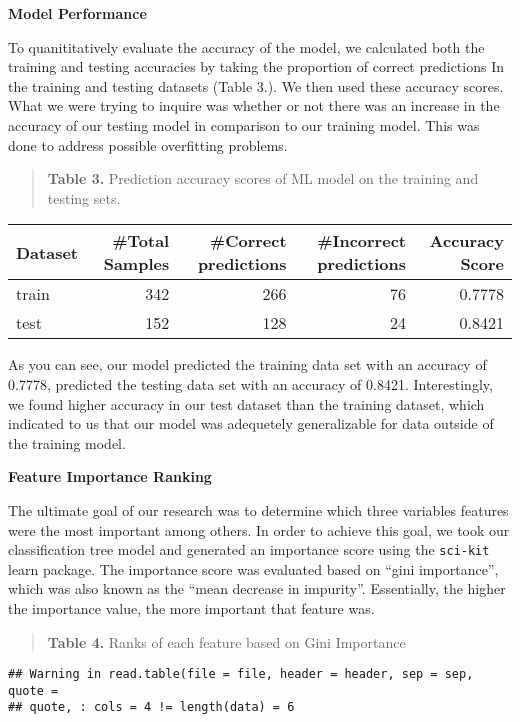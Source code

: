 \documentclass[]{article}
\begin{document}
\newpage

\textbf{Model Performance}

To quanititatively evaluate the accuracy of the model, we calculated
both the training and testing accuracies by taking the proportion of
correct predictions In the training and testing datasets (Table 3.). We
then used these accuracy scores. What we were trying to inquire was
whether or not there was an increase in the accuracy of our testing
model in comparison to our training model. This was done to address
possible overfitting problems.

\begin{quote}
\textbf{Table 3.} Prediction accuracy scores of ML model on the training
and testing sets.
\end{quote}

\begin{longtable}[]{@{}lrrrr@{}}
\toprule
Dataset & \#Total Samples & \#Correct predictions & \#Incorrect
predictions & Accuracy Score\tabularnewline
\midrule
\endhead
train & 342 & 266 & 76 & 0.7778\tabularnewline
test & 152 & 128 & 24 & 0.8421\tabularnewline
\bottomrule
\end{longtable}

As you can see, our model predicted the training data set with an
accuracy of 0.7778, predicted the testing data set with an accuracy of
0.8421. Interestingly, we found higher accuracy in our test dataset than
the training dataset, which indicated to us that our model was
adequetely generalizable for data outside of the training model.

\textbf{Feature Importance Ranking}

The ultimate goal of our research was to determine which three variables
features were the most important among others. In order to achieve this
goal, we took our classification tree model and generated an importance
score using the \texttt{sci-kit} learn package. The importance score was
evaluated based on ``gini importance'', which was also known as the
``mean decrease in impurity''. Essentially, the higher the importance
value, the more important that feature was.

\begin{quote}
\textbf{Table 4.} Ranks of each feature based on Gini Importance
\end{quote}

\begin{verbatim}
## Warning in read.table(file = file, header = header, sep = sep, quote =
## quote, : cols = 4 != length(data) = 6
\end{verbatim}
\end{document}
